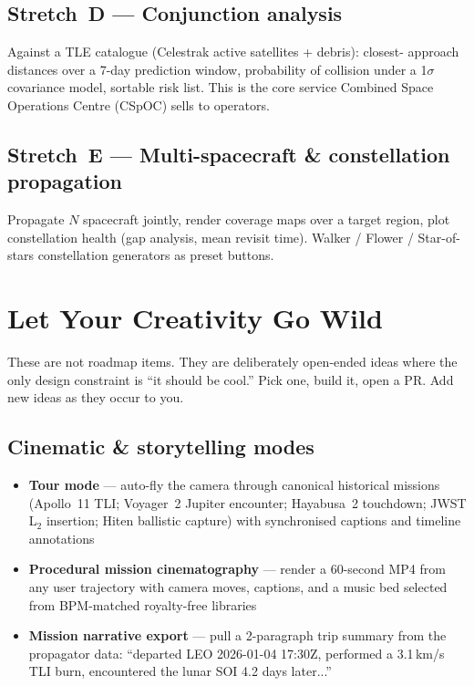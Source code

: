 \documentclass[11pt, a4paper]{article}
\begin{document}
\subsection{Stretch~D --- Conjunction analysis}

Against a TLE catalogue (Celestrak active satellites + debris): closest-
approach distances over a 7-day prediction window, probability of collision
under a 1$\sigma$ covariance model, sortable risk list. This is the core
service Combined Space Operations Centre (CSpOC) sells to operators.

\subsection{Stretch~E --- Multi-spacecraft \& constellation propagation}

Propagate $N$ spacecraft jointly, render coverage maps over a target
region, plot constellation health (gap analysis, mean revisit time).
Walker / Flower / Star-of-stars constellation generators as preset
buttons.

\newpage
\section{Let Your Creativity Go Wild}

These are not roadmap items. They are deliberately open-ended ideas where
the only design constraint is ``it should be cool.'' Pick one, build it,
open a PR. Add new ideas as they occur to you.

\subsection{Cinematic \& storytelling modes}

\begin{itemize}[leftmargin=*]
  \item \textbf{Tour mode} --- auto-fly the camera through canonical
        historical missions (Apollo~11 TLI; Voyager~2 Jupiter encounter;
        Hayabusa~2 touchdown; JWST L$_2$ insertion; Hiten ballistic
        capture) with synchronised captions and timeline annotations
  \item \textbf{Procedural mission cinematography} --- render a 60-second
        MP4 from any user trajectory with camera moves, captions, and a
        music bed selected from BPM-matched royalty-free libraries
  \item \textbf{Mission narrative export} --- pull a 2-paragraph trip
        summary from the propagator data: ``departed LEO 2026-01-04
        17:30Z, performed a 3.1\,km/s TLI burn, encountered the lunar
        SOI 4.2 days later...''
\end{itemize}
\end{document}

